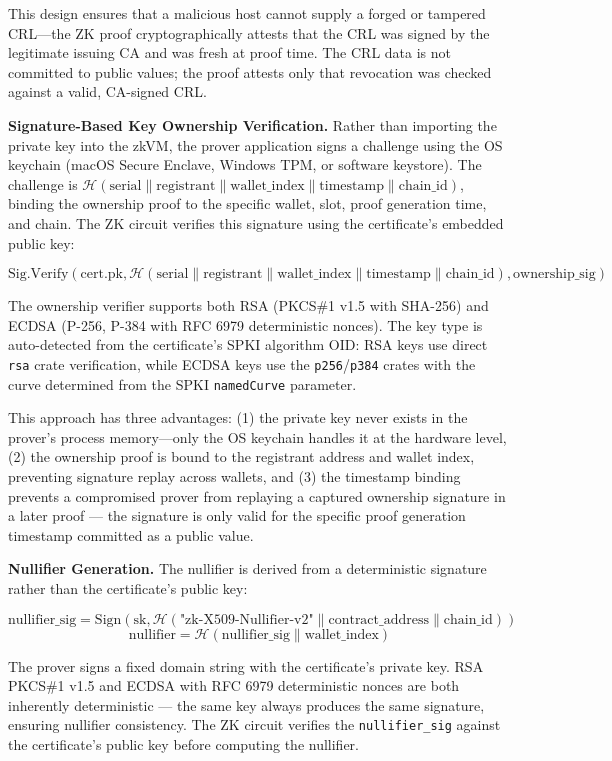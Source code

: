 \documentclass[11pt, a4paper]{article}
\begin{document}
This design ensures that a malicious host cannot supply a forged or
tampered CRL---the ZK proof cryptographically attests that the CRL was
signed by the legitimate issuing CA and was fresh at proof time. The CRL
data is not committed to public values; the proof attests only that
revocation was checked against a valid, CA-signed CRL.

\textbf{Signature-Based Key Ownership Verification.} Rather than
importing the private key into the zkVM, the prover application signs a
challenge using the OS keychain (macOS Secure Enclave, Windows TPM, or
software keystore). The challenge is
\(\mathcal{H}(\text{serial} \| \text{registrant} \| \text{wallet\_index} \| \text{timestamp} \| \text{chain\_id})\),
binding the ownership proof to the specific wallet, slot, proof
generation time, and chain. The ZK circuit verifies this signature using
the certificate's embedded public key:

\[\text{Sig.Verify}(\text{cert.pk}, \mathcal{H}(\text{serial} \| \text{registrant} \| \text{wallet\_index} \| \text{timestamp} \| \text{chain\_id}), \text{ownership\_sig})\]

The ownership verifier supports both RSA (PKCS\#1 v1.5 with SHA-256) and
ECDSA (P-256, P-384 with RFC 6979 \cite{ref22} deterministic nonces). The
key type is auto-detected from the certificate's SPKI algorithm OID: RSA
keys use direct \texttt{rsa} crate verification, while ECDSA keys use
the \texttt{p256}/\texttt{p384} crates with the curve determined from
the SPKI \texttt{namedCurve} parameter.

This approach has three advantages: (1) the private key never exists in
the prover's process memory---only the OS keychain handles it at
the hardware level, (2) the ownership proof is bound to the registrant
address and wallet index, preventing signature replay across wallets,
and (3) the timestamp binding prevents a compromised prover from
replaying a captured ownership signature in a later proof --- the
signature is only valid for the specific proof generation timestamp
committed as a public value.

\textbf{Nullifier Generation.} The nullifier is derived from a
deterministic signature rather than the certificate's public key:

\[\text{nullifier\_sig} = \text{Sign}(\text{sk}, \mathcal{H}(\text{"zk-X509-Nullifier-v2"} \| \text{contract\_address} \| \text{chain\_id}))\]
\[\text{nullifier} = \mathcal{H}(\text{nullifier\_sig} \| \text{wallet\_index})\]

The prover signs a fixed domain string with the certificate's private
key. RSA PKCS\#1 v1.5 and ECDSA with RFC 6979 \cite{ref22} deterministic
nonces are both inherently deterministic --- the same key always
produces the same signature, ensuring nullifier consistency. The ZK
circuit verifies the \texttt{nullifier\_sig} against the certificate's
public key before computing the nullifier.
\end{document}
